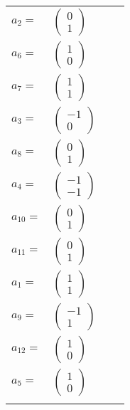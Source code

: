 \documentclass[1p]{elsarticle_modified}
\theoremstyle{definition}
\begin{document}
\begin{tabular}{m{7pt} m{180pt} m{7pt} m{180pt} }
\flushright $a_{2}=$&$\begin{pmatrix}0\\1\end{pmatrix}$ \\
\flushright $a_{6}=$&$\begin{pmatrix}1\\0\end{pmatrix}$ \\
\flushright $a_{7}=$&$\begin{pmatrix}1\\1\end{pmatrix}$ \\
\flushright $a_{3}=$&$\begin{pmatrix}-1\\0\end{pmatrix}$ \\
\flushright $a_{8}=$&$\begin{pmatrix}0\\1\end{pmatrix}$ \\
\flushright $a_{4}=$&$\begin{pmatrix}-1\\-1\end{pmatrix}$ \\
\flushright $a_{10}=$&$\begin{pmatrix}0\\1\end{pmatrix}$ \\
\flushright $a_{11}=$&$\begin{pmatrix}0\\1\end{pmatrix}$ \\
\flushright $a_{1}=$&$\begin{pmatrix}1\\1\end{pmatrix}$ \\
\flushright $a_{9}=$&$\begin{pmatrix}-1\\1\end{pmatrix}$ \\
\flushright $a_{12}=$&$\begin{pmatrix}1\\0\end{pmatrix}$ \\
\flushright $a_{5}=$&$\begin{pmatrix}1\\0\end{pmatrix}$\\&\end{tabular}
\end{document}
